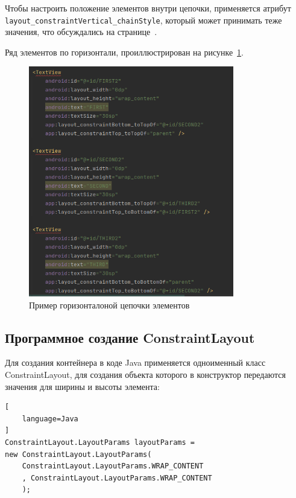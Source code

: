Чтобы настроить положение элементов внутри цепочки, применяется
атрибут \texttt{layout\_constraintVertical\_chainStyle},
который может принимать теже значения, что обсуждались
на странице~\pageref{tag:chain:style}.

Ряд элементов по горизонтали, проиллюстрирован на
рисунке~\ref{fig:xml:chain:vertical}.

\begin{figure}[h!tp]
	\centering
	\includegraphics[width=0.8\textwidth]{Screenshot from 2023-03-12 16-27-32.png}
	\caption{Пример горизонталоной цепочки элементов}
	\label{fig:xml:chain:vertical}
\end{figure}

\subsection{Программное создание ConstraintLayout}
Для создания контейнера в коде Java применяется одноименный класс
ConstraintLayout, для создания объекта которого в конструктор передаются
значения для ширины и высоты элемента:

\begin{lstlisting}[
	language=Java
]
ConstraintLayout.LayoutParams layoutParams = 
new ConstraintLayout.LayoutParams(
	ConstraintLayout.LayoutParams.WRAP_CONTENT
	, ConstraintLayout.LayoutParams.WRAP_CONTENT
	);
\end{lstlisting}

